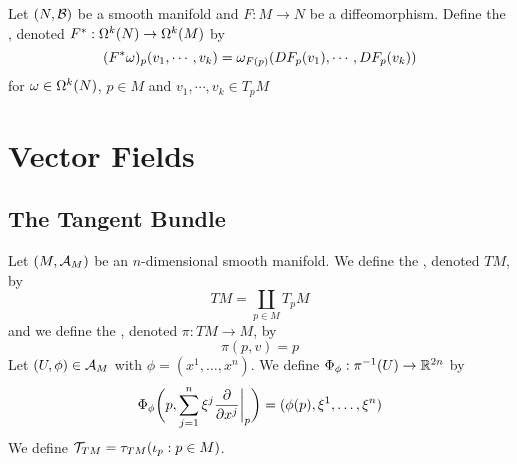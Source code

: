 \documentclass{book}
\begin{document}
	
	\begin{defn}
		Let $(N, \mathcal{B})$ be a smooth manifold and $F: M \rightarrow N$ be a diffeomorphism. Define the , denoted $F^*: \Omega^k(N) \rightarrow \Omega^k(M)$ by  $$(F^* \omega)_p (v_1, \cdots, v_k) = \omega_{F(p)} (DF_p(v_1), \cdots, DF_p(v_k))$$ for $\omega \in \Omega^k(N)$, $p \in M$ and $v_1, \cdots, v_k \in T_{p}M$
	\end{defn}


	




































\newpage
\chapter{Vector Fields}

\section{The Tangent Bundle}

\begin{defn}
	Let $(M, \mathcal{A}_M)$ be an $n$-dimensional smooth manifold. We define the , denoted $TM$, by  
	$$TM = \coprod_{p \in M} T_p M $$ 
	and we define the , denoted $\pi: TM \rightarrow M$, by 
	$$\pi(p, v) = p$$
	Let $(U, \phi) \in \mathcal{A}_M$ with $\phi = (x^1, \ldots, x^n)$. We define $\Phi_{\phi}: \pi^{-1}(U) \rightarrow \mathbb{R}^{2n}$ by 
	$$\Phi_{\phi} \bigg(p, \sum_{j=1}^n \xi^j \frac{\partial}{\partial x^j} \bigg|_p \bigg) = (\phi(p), \xi^1, \ldots, \xi^n)$$ 
	We define $\mathcal{T}_{TM} = \tau_{TM}(\iota_p : p \in M)$.
\end{defn}
\end{document}
